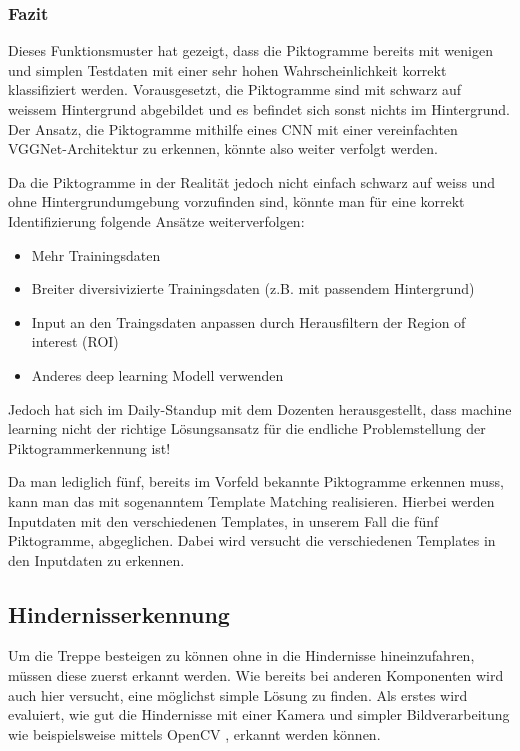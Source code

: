 \subsubsection{Fazit}
Dieses Funktionsmuster hat gezeigt, dass die Piktogramme bereits mit wenigen und simplen Testdaten mit einer sehr hohen Wahrscheinlichkeit korrekt klassifiziert werden. Vorausgesetzt, die Piktogramme sind mit schwarz auf weissem Hintergrund abgebildet und es befindet sich sonst nichts im Hintergrund. Der Ansatz, die Piktogramme mithilfe eines CNN mit einer vereinfachten VGGNet-Architektur zu erkennen, könnte also weiter verfolgt werden.  

Da die Piktogramme in der Realität jedoch nicht einfach schwarz auf weiss und ohne Hintergrundumgebung vorzufinden sind, könnte man für eine korrekt Identifizierung folgende Ansätze weiterverfolgen:
\begin{itemize}
    \item Mehr Trainingsdaten
    \item Breiter diversivizierte Trainingsdaten (z.B. mit passendem Hintergrund)
    \item Input an den Traingsdaten anpassen durch Herausfiltern der Region of interest (ROI)
    \item Anderes deep learning Modell verwenden
 \end{itemize}
 
Jedoch hat sich im Daily-Standup mit dem Dozenten herausgestellt, dass machine learning nicht der richtige Lösungsansatz für die endliche Problemstellung der Piktogrammerkennung ist! 

Da man lediglich fünf, bereits im Vorfeld bekannte Piktogramme erkennen muss, kann man das mit sogenanntem Template Matching \cite{OpenCV-Template-Matching} realisieren. Hierbei werden Inputdaten mit den verschiedenen Templates, in unserem Fall die fünf Piktogramme, abgeglichen. Dabei wird versucht die verschiedenen Templates in den Inputdaten zu erkennen. 


\subsection{Hindernisserkennung}
\label{sec:hindernisserkennung-funktinosmuster}
Um die Treppe besteigen zu können ohne in die Hindernisse hineinzufahren, müssen
diese zuerst erkannt werden. Wie bereits bei anderen Komponenten wird auch hier versucht, eine möglichst simple Lösung zu finden.
Als erstes wird evaluiert, wie gut die Hindernisse mit einer Kamera und simpler Bildverarbeitung wie beispielsweise mittels OpenCV \cite{OpenCV}, erkannt werden
können.

